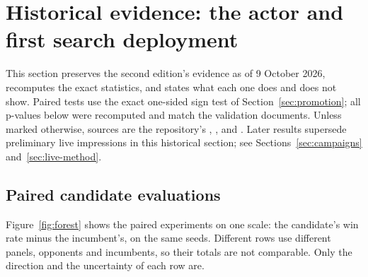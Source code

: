\section{Historical evidence: the actor and first search deployment}
\label{sec:evidence}

This section preserves the second edition's evidence as of 9 October 2026,
recomputes the exact statistics, and states what each one does and does not
show. Paired tests use the exact one-sided sign test of
Section~\ref{sec:promotion}; all p-values below were recomputed and match the
validation documents. Unless marked otherwise, sources are the repository's
, ,
 and .
Later results supersede preliminary live impressions in this historical
section; see Sections~\ref{sec:campaigns} and~\ref{sec:live-method}.

\subsection{Paired candidate evaluations}
Figure~\ref{fig:forest} shows the paired experiments on one scale: the
candidate's win rate minus the incumbent's, on the same seeds. Different rows
use different panels, opponents and incumbents, so their totals are not
comparable. Only the direction and the uncertainty of each row are.

